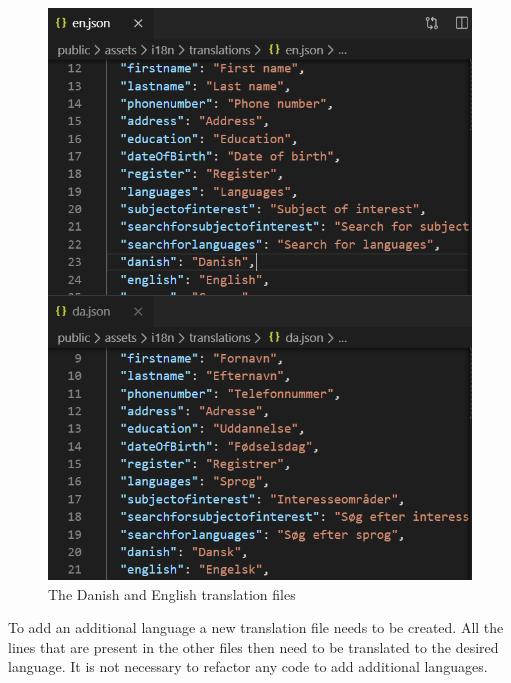 \begin{figure}
    \centering
    \includegraphics[scale=0.5]{figures/translations.PNG}
    \caption{The Danish and English translation files}
    \label{fig:translationfiles}
\end{figure}
\noindent
To add an additional language a new translation file needs to be created.
All the lines that are present in the other files then need to be translated to the desired language. 
It is not necessary to refactor any code to add additional languages.
